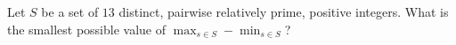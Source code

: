 Let $S$ be a set of $13$ distinct, pairwise relatively prime, positive integers. What is the smallest possible value of $\max_{s \in S} - \min_{s \in S}$?
